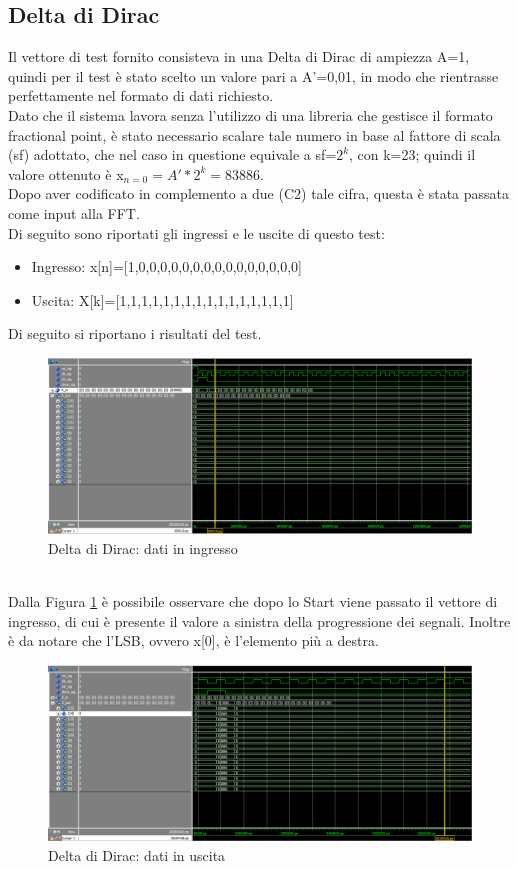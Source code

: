 \documentclass[a4paper, titlepage]{article}
\begin{document}
\subsection{Delta di Dirac}
Il vettore di test fornito consisteva in una Delta di Dirac di ampiezza A=1, quindi per il test è stato scelto un valore pari a A'=0,01, in modo che rientrasse perfettamente nel formato di dati richiesto.\\Dato che il sistema lavora senza l'utilizzo di una libreria che gestisce il formato fractional point, è stato necessario scalare tale numero in base al fattore di scala (sf) adottato, che nel caso in questione equivale a sf=$2^k$, con k=23; quindi il valore ottenuto è x$_{n=0}=A'*2^k=83886$.\\ Dopo aver codificato in complemento a due (C2) tale cifra, questa è stata passata come input alla FFT.\\Di seguito sono riportati gli ingressi e le uscite di questo test:
\begin{itemize}
    \item Ingresso: x[n]=[1,0,0,0,0,0,0,0,0,0,0,0,0,0,0,0]
    \item Uscita:   X[k]=[1,1,1,1,1,1,1,1,1,1,1,1,1,1,1,1]
\end{itemize}
Di seguito si riportano i risultati del test.
\begin{figure}[h]
    \centering
    \includegraphics[scale=0.45]{test_delta/fs_delta_in.png}
    \caption{Delta di Dirac: dati in ingresso}
    \label{fig:delta_in}
\end{figure}\\
\noindent Dalla Figura \ref{fig:delta_in} è possibile osservare che dopo lo Start viene passato il vettore di ingresso, di cui è presente il valore a sinistra della progressione dei segnali. Inoltre è da notare che l'LSB, ovvero x[0], è l'elemento più a destra.
\pagebreak
\begin{figure}[h]
    \centering
    \includegraphics[scale=0.45]{test_delta/fs_delta_out.png}
    \caption{Delta di Dirac: dati in uscita}
    \label{fig:delta_out}
\end{figure}\\
\end{document}
